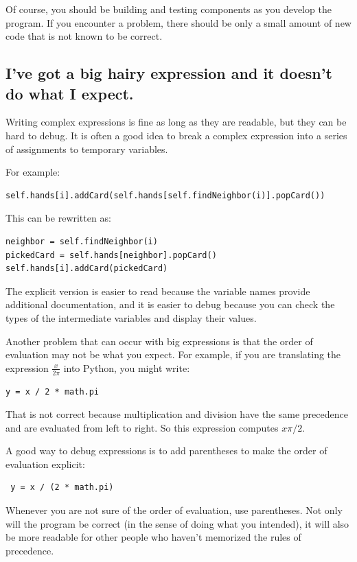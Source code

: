 \documentclass[10pt]{book}
\begin{document}
Of course, you should be building and testing components as you
develop the program.  If you encounter a problem,
there should be only a small amount of new code
that is not known to be correct.


\subsection{I've got a big hairy expression and it doesn't
do what I expect.}

Writing complex expressions is fine as long as they are readable,
but they can be hard to debug.  It is often a good idea to
break a complex expression into a series of assignments to
temporary variables.

For example:

\begin{verbatim}
self.hands[i].addCard(self.hands[self.findNeighbor(i)].popCard())
\end{verbatim}
%
This can be rewritten as:

\begin{verbatim}
neighbor = self.findNeighbor(i)
pickedCard = self.hands[neighbor].popCard()
self.hands[i].addCard(pickedCard)
\end{verbatim}
%
The explicit version is easier to read because the variable
names provide additional documentation, and it is easier to debug
because you can check the types of the intermediate variables
and display their values.

Another problem that can occur with big expressions is
that the order of evaluation may not be what you expect.
For example, if you are translating the expression
$\frac{x}{2 \pi}$ into Python, you might write:

\begin{verbatim}
y = x / 2 * math.pi
\end{verbatim}
%
That is not correct because multiplication and division have
the same precedence and are evaluated from left to right.
So this expression computes $x \pi / 2$.

A good way to debug expressions is to add parentheses to make
the order of evaluation explicit:

\begin{verbatim}
 y = x / (2 * math.pi)
\end{verbatim}
%
Whenever you are not sure of the order of evaluation, use
parentheses.  Not only will the program be correct (in the sense
of doing what you intended), it will also be more readable for
other people who haven't memorized the rules of precedence.
\end{document}
